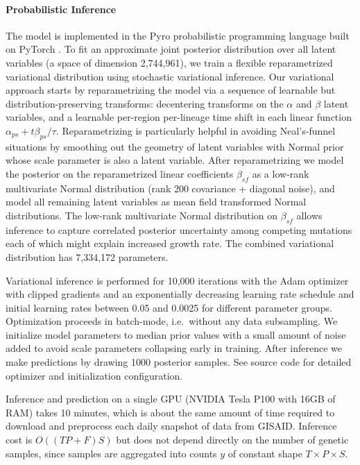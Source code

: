 \documentclass[12pt]{article}
\begin{document}
\paragraph*{Probabilistic Inference}

The model is implemented in the Pyro probabilistic programming language \cite{bingham2019pyro} built on PyTorch \cite{paszke2017automatic}.
To fit an approximate joint posterior distribution over all latent variables (a space of dimension 2,744,961), we train a flexible reparametrized variational distribution using stochastic variational inference.
Our variational approach starts by reparametrizing the model via a sequence of learnable but distribution-preserving transforms: decentering transforms \cite{gorinova2020automatic} on the $\alpha$ and $\beta$ latent variables, and a learnable per-region per-lineage time shift in each linear function $\alpha_{ps}+t\beta_{ps}/\tau$.
Reparametrizing is particularly helpful in avoiding Neal's-funnel situations \cite{neal2003slice} by smoothing out the geometry of latent variables with Normal prior whose scale parameter is also a latent variable.
After reparametrizing we model the posterior on the reparametrized linear coefficients $\beta_{sf}$ as a low-rank multivariate Normal distribution (rank 200 covariance + diagonal noise), and model all remaining latent variables as mean field transformed Normal distributions.
The low-rank multivariate Normal distribution on $\beta_{sf}$ allows inference to capture correlated posterior uncertainty among competing mutations each of which might explain increased growth rate.
The combined variational distribution has 7,334,172 parameters.

Variational inference is performed for 10,000 iterations with the Adam optimizer with clipped gradients and an exponentially decreasing learning rate schedule and initial learning rates between 0.05 and 0.0025 for different parameter groups.
Optimization proceeds in batch-mode, i.e.~without any data subsampling.
We initialize model parameters to median prior values with a small amount of noise added to avoid scale parameters collapsing early in training.
After inference we make predictions by drawing 1000 posterior samples.
See source code for detailed optimizer and initialization configuration.

Inference and prediction on a single GPU (NVIDIA Tesla P100 with 16GB of RAM) takes 10 minutes, which is about the same amount of time required to download and preprocess each daily snapshot of data from GISAID.
Inference cost is $O((TP+F)S)$ but does not depend directly on the number of genetic samples, since samples are aggregated into counts $y$ of constant shape $T\times P\times S$.
\end{document}
